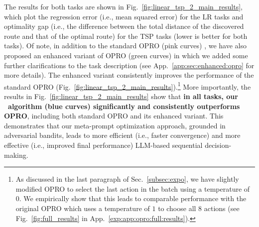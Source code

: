 The results for both tasks are shown in Fig.~\ref{fig:linear_tsp_2_main_results}, which plot the regression error (i.e., mean squared error) for the LR tasks and optimality gap (i.e., the difference between the total distance of the discovered route and that of the optimal route) for the TSP tasks (lower is better for both tasks).
Of note, in addition to the standard OPRO (pink curves) \cite{yang2023large}, we have also proposed an enhanced variant of OPRO (green curves) in which we added some further clarifications to the task description 
(see App.~\ref{app:sec:enhanced:opro} for more details). 
The enhanced variant consistently improves the performance of the standard OPRO (Fig.~\ref{fig:linear_tsp_2_main_results}).\footnote{As discussed in the last paragraph of Sec.~\ref{subsec:expo}, we have slightly modified OPRO to select the last action in the batch using a temperature of $0$. We empirically show that this leads to comparable performance with the original OPRO which uses a temperature of $1$ to choose all $8$ actions (see Fig.~\ref{fig:full_results} in App.~\ref{exp:app:opro:full:results}).}
More importantly, the results in Fig.~\ref{fig:linear_tsp_2_main_results} show that \textbf{in all tasks, our \alg~algorithm (blue curves) significantly and consistently outperforms OPRO}, including both standard OPRO and its enhanced variant.
This demonstrates that our meta-prompt optimization approach, grounded in adversarial bandits, leads to more efficient (i.e., faster convergence) and more effective (i.e., improved final performance) LLM-based sequential decision-making.

